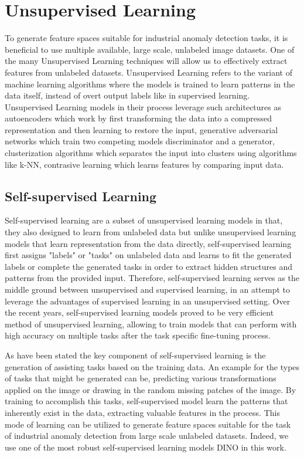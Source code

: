 \section{Unsupervised Learning}
\label{usupervised learning}
To generate feature spaces suitable for industrial anomaly detection tasks, it is beneficial to use multiple available, large scale, unlabeled image datasets. One of the many Unsupervised Learning techniques will allow us to effectively extract features from unlabeled datasets. Unsupervised Learning refers to the variant of machine learning algorithms where the models is trained to learn patterns in the data itself, instead of overt output labels like in supervised learning. Unsupervised Learning models in their process leverage such architectures as autoencoders which work by first transforming the data into a compressed representation and then learning to restore the input, generative adversarial networks which train two competing models discriminator and a generator, clusterization algorithms which separates the input into clusters using algorithms like k-NN, contrasive learning which learns features by comparing input data. 

\subsection{Self-supervised Learning}
\label{self-supervised learning}
Self-supervised learning are a subset of unsupervised learning models in that, they also designed to learn from unlabeled data but unlike unsupervised learning models that learn representation from the data directly, self-supervised learning first assigns "labels" or "tasks" on unlabeled data and learns to fit the generated labels or complete the generated tasks in order to extract hidden structures and patterns from the provided input. Therefore, self-supervised learning serves as the middle ground between unsupervised and supervised learning, in an attempt to leverage the advantages of supervised learning in an unsupervised setting. Over the recent years, self-supervised learning models proved to be very efficient method of unsupervised learning, allowing to train models that can perform with high accuracy on multiple tasks after the task specific fine-tuning process.

As have been stated the key component of self-supervised learning is the generation of assisting tasks based on the training data. An example for the types of tasks that might be generated can be, predicting various transformations applied on the image or drawing in the random missing patches of the image. By training to accomplish this tasks, self-supervised model learn the patterns that inherently exist in the data, extracting valuable features in the process. This mode of learning can be utilized to generate feature spaces suitable for the task of industrial anomaly detection from large scale unlabeled datasets. Indeed, we use one of the most robust self-supervised learning models DINO in this work.

